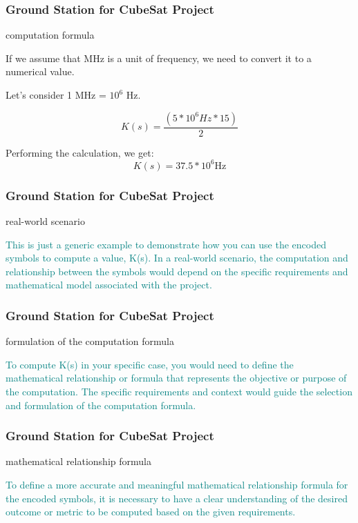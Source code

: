 \newpage
\begin{frame}
\frametitle{Ground Station for CubeSat Project }
\begin{block}{computation formula}

If we assume that MHz is a unit of frequency, we need to convert it to a numerical value. 

Let's consider 1 MHz = $10^6$ Hz.

\[ 
K(s) = \frac{(5 * 10^6 Hz * 15)}{  2}
\]

Performing the calculation, we get:
\[ 
K(s) = 37.5 * 10^6  \textrm{Hz} 
\]


\end{block}
\end{frame}


\newpage
\begin{frame}
\frametitle{Ground Station for CubeSat Project }
\begin{block}{real-world scenario}

\textcolor{teal}{
This is just a generic example to demonstrate how you can use the encoded symbols to compute a value, K(s). In a real-world scenario, the computation and relationship between the symbols would depend on the specific requirements and mathematical model associated with the project.}


\end{block}
\end{frame}



\newpage
\begin{frame}
\frametitle{Ground Station for CubeSat Project }
\begin{block}{formulation of the computation formula}

\textcolor{teal}{
To compute K(s) in your specific case, you would need to define the mathematical relationship or formula that represents the objective or purpose of the computation. The specific requirements and context would guide the selection and formulation of the computation formula.}

\end{block}
\end{frame}

\newpage
\begin{frame}
\frametitle{Ground Station for CubeSat Project }
\begin{block}{mathematical relationship formula }

\textcolor{teal}{
To define a more accurate and meaningful mathematical relationship formula for the encoded symbols, it is necessary to have a clear understanding of the desired outcome or metric to be computed based on the given requirements.}


\end{block}
\end{frame}



